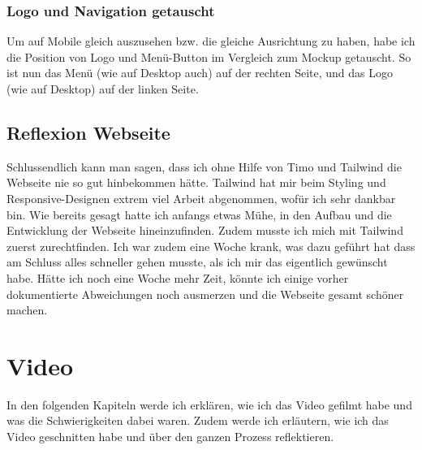 \documentclass[11pt]{article}
\begin{document}
    \subsubsection{Logo und Navigation getauscht}
    Um auf Mobile gleich auszusehen bzw. die gleiche Ausrichtung zu haben, habe ich die Position von Logo und Menü-Button im Vergleich zum Mockup
    getauscht. So ist nun das Menü (wie auf Desktop auch) auf der rechten Seite, und das Logo (wie auf Desktop) auf der linken Seite.

    \subsection{Reflexion Webseite}
    Schlussendlich kann man sagen, dass ich ohne Hilfe von Timo und Tailwind die Webseite nie so gut hinbekommen hätte. Tailwind hat mir
    beim Styling und Responsive-Designen extrem viel Arbeit abgenommen, wofür ich sehr dankbar bin. Wie bereits gesagt hatte ich anfangs etwas
    Mühe, in den Aufbau und die Entwicklung der Webseite hineinzufinden. Zudem musste ich mich mit Tailwind zuerst zurechtfinden. Ich war zudem
    eine Woche krank, was dazu geführt hat dass am Schluss alles schneller gehen musste, als ich mir das eigentlich gewünscht habe. Hätte ich noch
    eine Woche mehr Zeit, könnte ich einige vorher dokumentierte Abweichungen noch ausmerzen und die Webseite gesamt schöner machen.

    \section{Video}
    In den folgenden Kapiteln werde ich erklären, wie ich das Video gefilmt habe und was die Schwierigkeiten dabei waren. Zudem werde ich
    erläutern, wie ich das Video geschnitten habe und über den ganzen Prozess reflektieren.

\end{document}

